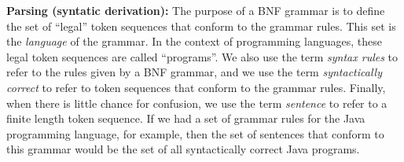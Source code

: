 \begin{minipage}[t]{\sw}
\slidenumber
\LARGE
{\bf Parsing (syntatic derivation):}\exx
\emm{\Large\LightBox{\MYlon}}\exx
The purpose of a BNF grammar is to define
the set of ``legal'' token sequences
that conform to the grammar rules.
This set is the {\em language} of the grammar.
In the context of programming languages,
these legal token sequences are called ``programs''.
We also use the term {\em syntax rules} to refer
to the rules given by a BNF grammar,
and we use the term {\em syntactically correct} to refer
to token sequences that conform to the grammar rules.
Finally, when there is little chance for confusion,
we use the term {\em sentence}
to refer to a finite length token sequence.\exx
If we had a set of grammar rules
for the Java programming language, for example,
then the set of sentences that conform to this grammar
would be the set of all syntactically correct Java programs.\exx
\end{minipage}
\clearpage
